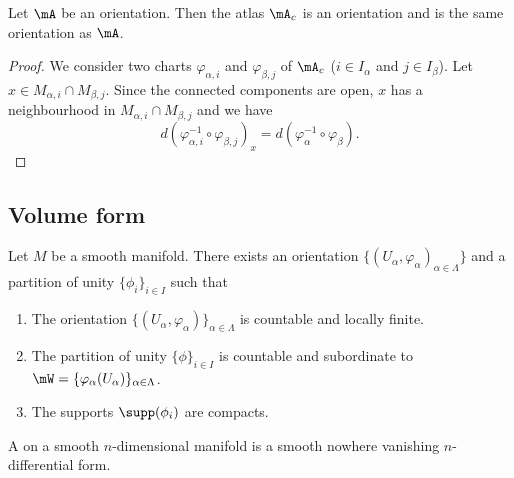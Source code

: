 \begin{proposition}		\label{PROPooHQSSooDCjlIX}
	Let \( \mA\) be an orientation. Then the atlas \( \mA_c\) is an orientation and is the same orientation as \( \mA\).
\end{proposition}

\begin{proof}
	We consider two charts \( \varphi_{\alpha,i}\) and \( \varphi_{\beta,j}\) of \( \mA_c\) (\( i\in I_{\alpha}\) and \( j\in I_{\beta}\)). Let \( x\in M_{\alpha,i}\cap M_{\beta,j}\). Since the connected components are open, \( x\) has a neighbourhood in \( M_{\alpha,i}\cap M_{\beta,j}\) and we have
	\begin{equation}
		d(\varphi_{\alpha,i}^{-1}\circ\varphi_{\beta,j})_x=d(\varphi_{\alpha}^{-1}\circ \varphi_{\beta}).
	\end{equation}
\end{proof}

\subsection{Volume form}

\begin{proposition}		\label{PROPooBIVHooXOycnS}
	Let \( M\) be a smooth manifold. There exists an orientation \( \{ (U_{\alpha},\varphi_{\alpha})_{\alpha\in \Lambda} \}\) and a partition of unity \( \{ \phi_i \}_{i\in I}\) such that
	\begin{enumerate}
		\item
		      The orientation \( \{ (U_{\alpha},\varphi_{\alpha}) \}_{\alpha\in \Lambda}\) is countable and locally finite.
		\item
		      The partition of unity \( \{ \phi \}_{i\in I}\)  is countable and subordinate to \( \mW=\{ \varphi_{\alpha}(U_{\alpha}) \}_{\alpha\in \Lambda}\).
		\item
		      The supports \( \supp(\phi_i)\) are compacts.
	\end{enumerate}
\end{proposition}



\begin{definition}			\label{DEFooOBZEooMZauZF}
	A  on a smooth \(n \)-dimensional manifold is a smooth nowhere vanishing \( n\)-differential form.
\end{definition}

